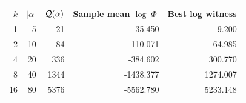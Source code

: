 \begin{tabular}{rrrrr}
\toprule
$k$ & $|\alpha|$ & $\mathcal Q(\alpha)$ & Sample mean $\log|\Phi|$ & Best log witness\\
\midrule
1 & 5 & 21 & -35.450 & 9.200 \\
2 & 10 & 84 & -110.071 & 64.985 \\
4 & 20 & 336 & -384.602 & 300.770 \\
8 & 40 & 1344 & -1438.377 & 1274.007 \\
16 & 80 & 5376 & -5562.780 & 5233.148 \\
\bottomrule
\end{tabular}
